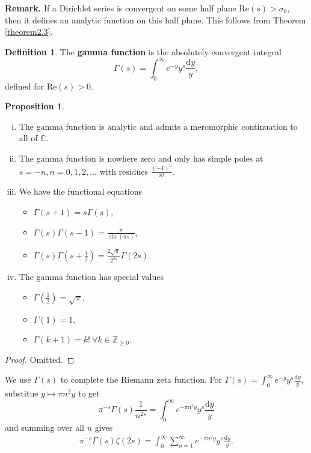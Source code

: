 \documentclass{article}
\theoremstyle{definition}
\newtheorem{prop}[theorem]{Proposition}
\newtheorem{defn}{Definition}[section]
\begin{document}
\textbf{Remark.} If a Dirichlet series is convergent on some half plane $\text{Re}(s)>\sigma_0$, then it defines an analytic function on this half plane. This follows from Theorem \ref{theorem2.3}.
\begin{defn}\label{defn2.11}
    The \textbf{gamma function} is the absolutely convergent integral \[
    \Gamma(s) = \int_{0}^{\infty} e^{-y}y^s \frac{\mathrm{d}y}{y},
    \]
    defined for $\text{Re}(s)>0$.
\end{defn}
\begin{prop}\label{prop2.12}
    \begin{enumerate}[(i)]
        \item The gamma function is analytic and admits a meromorphic continuation to all of $\mathbb{C}$.
        \item The gamma function is nowhere zero and only has simple poles at $s = -n, n = 0,1,2,\ldots$ with residues $\frac{(-1)^n}{n!}$.
        \item We have the functional equations
        \begin{itemize}
            \item $\Gamma(s+1)=s \Gamma(s)$,
            \item $\Gamma(s) \Gamma(s-1) = \frac{\pi}{\sin(\pi s)}$,
            \item $\Gamma(s) \Gamma\left(s+\frac{1}{2}\right) = \frac{2\sqrt{\pi}}{2^{2s}}\Gamma(2s)$.
        \end{itemize}
        \item The gamma function has special values 
        \begin{itemize}
            \item $\Gamma \left(\frac{1}{2}\right) = \sqrt{\pi}$,
            \item $\Gamma(1)=1$,
            \item $\Gamma(k+1) = k! ~\forall k \in \mathbb{Z}_{\ge 0}$.
        \end{itemize}
    \end{enumerate}
\end{prop}
\begin{proof}
    Omitted.
\end{proof}
We use $\Gamma(s)$ to complete the Riemann zeta function. For $\Gamma(s) = \int_{0}^{\infty} e^{-y}y^s \frac{\mathrm{d}y}{y}$, substitue $y \mapsto \pi n^2y$ to get \[
\pi^{-s}\Gamma(s)\frac{1}{n^{2s}} = \int_{0}^{\infty} e^{-\pi n^2 y} y^s \frac{\mathrm{d}y}{y}
\]
and summing over all $n$ gives 
\begin{align*}
    \pi^{-s}\Gamma(s)\zeta(2s) = \int_{0}^{\infty} \sum_{n=1}^{\infty} e^{-\pi n^2 y} y^s \frac{\mathrm{d}y}{y}.
\end{align*}
\end{document}
